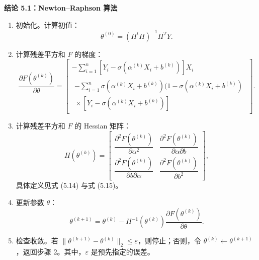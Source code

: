 \par\medskip{}
\noindent\textbf{结论 5.1：Newton–Raphson 算法}\par
\begin{enumerate}[label=步骤 \arabic*：,leftmargin=4.8em]
\item 初始化。计算初值：
\[
\theta^{(0)}=(H^tH)^{-1}H^TY.
\]
\item 计算残差平方和 $F$ 的梯度：
\[
\frac{\partial F(\theta^{(k)})}{\partial\theta}=
\begin{bmatrix}
-\displaystyle\sum_{i=1}^n[Y_i-\sigma(\alpha^{(k)}X_i+b^{(k)})]X_i\\[6pt]
\begin{gathered}
-\displaystyle\sum_{i=1}^n\sigma(\alpha^{(k)}X_i+b^{(k)})(1-\sigma(\alpha^{(k)}X_i+b^{(k)})\\[-1pt]
{}\times[Y_i-\sigma(\alpha^{(k)}X_i+b^{(k)})]
\end{gathered}
\end{bmatrix}.
\]
\item 计算残差平方和 $F$ 的 Hessian 矩阵：
\[
H(\theta^{(k)})=
\begin{bmatrix}
\dfrac{\partial^2F(\theta^{(k)})}{\partial\alpha^2}
&\dfrac{\partial^2F(\theta^{(k)})}{\partial\alpha\partial b}\\[6pt]
\dfrac{\partial^2F(\theta^{(k)})}{\partial b\partial\alpha}
&\dfrac{\partial^2F(\theta^{(k)})}{\partial b^2}
\end{bmatrix},
\]
具体定义见式 (5.14) 与式 (5.15)。
\item 更新参数 $\theta$：
\[
\theta^{(k+1)}=\theta^{(k)}-H^{-1}(\theta^{(k)})
\frac{\partial F(\theta^{(k)})}{\partial\theta}.
\]
\item 检查收敛。若 $\lVert\theta^{(k+1)}-\theta^{(k)}\rVert_2\leq\varepsilon$，则停止；否则，令 $\theta^{(k)}\leftarrow\theta^{(k+1)}$，返回步骤 2。其中，$\varepsilon$ 是预先指定的误差。
\end{enumerate}
